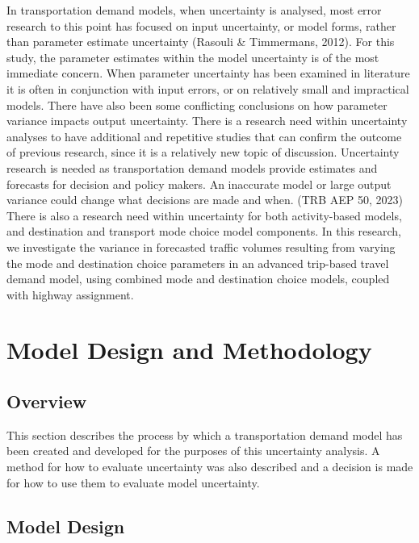\documentclass[fancy, masters, twoside]{byuthesis}
\begin{document}
In transportation demand models, when uncertainty is analysed, most error research to this point has focused on input uncertainty, or model forms, rather than parameter estimate uncertainty (Rasouli \& Timmermans, 2012). For this study, the parameter estimates within the model uncertainty is of the most immediate concern. When parameter uncertainty has been examined in literature it is often in conjunction with input errors, or on relatively small and impractical models. There have also been some conflicting conclusions on how parameter variance impacts output uncertainty. There is a research need within uncertainty analyses to have additional and repetitive studies that can confirm the outcome of previous research, since it is a relatively new topic of discussion. Uncertainty research is needed as transportation demand models provide estimates and forecasts for decision and policy makers. An inaccurate model or large output variance could change what decisions are made and when. (TRB AEP 50, 2023) There is also a research need within uncertainty for both activity-based models, and destination and transport mode choice model components. In this research, we investigate the variance in forecasted traffic volumes resulting from varying the mode and destination choice parameters in an advanced trip-based travel demand model, using combined mode and destination choice models, coupled with highway assignment.

\hypertarget{model-design-and-methodology}{%
\chapter{Model Design and Methodology}\label{model-design-and-methodology}}

\hypertarget{overview}{%
\section{Overview}\label{overview}}

This section describes the process by which a transportation demand model has been created and developed for the purposes of this uncertainty analysis. A method for how to evaluate uncertainty was also described and a decision is made for how to use them to evaluate model uncertainty.

\hypertarget{model-design}{%
\section{Model Design}\label{model-design}}
\end{document}
